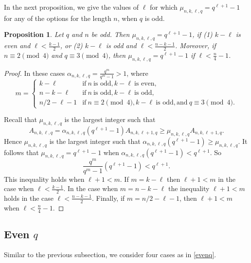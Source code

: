 \documentclass[a4paper,11pt]{article}
\newtheorem{proposition}[theorem]{Proposition}
\begin{document}
In the next proposition, we give the values of $\ell$ for which $\mu_{n,k,\ell,q}=q^{\ell+1}-1$ for any of the options for the length $n$, when $q$ is odd.

\begin{proposition}\label{prop:oddq}
Let $q$ and $n$ be odd. Then $\mu_{n,k,\ell,q}=q^{\ell+1}-1$, if (1) $k-\ell$ is even and $\ell<\frac{k-1}{2}$, or (2) $k-\ell$ is odd and $\ell<\frac{n-k-1}{2}$.
Moreover, if $n\equiv 2\pmod 4$ and $q\equiv 3\pmod 4$, then $\mu_{n,k,\ell,q}=q^{\ell+1}-1$ if $\ell<\frac{n}{4}-1$.
\end{proposition}

\begin{proof} In these cases $\alpha_{n,k,\ell,q}=\frac{q^m}{q^m-1}>1$, where
\[
m=\left\{\begin{array}{ll}
k-\ell&\mbox{if} \ n \ \mbox{is odd}, k-\ell \ \mbox{is even},\\
n-k-\ell&\mbox{if} \ n \ \mbox{is odd}, k-\ell \ \mbox{is odd},\\
n/2-\ell-1&\mbox{if} \ n\equiv 2\pmod 4, k-\ell \ \mbox{is odd}, \mbox{and} \ q\equiv 3\pmod 4.
\end{array}\right.
\]

Recall that $\mu_{n,k,\ell,q}$ is the largest integer such that
$$A_{n,k,\ell,q}=\alpha_{n,k,\ell,q}(q^{\ell+1}-1)A_{n,k,\ell+1,q} \ge \mu_{n,k,\ell,q} A_{n,k,\ell+1,q}.$$
Hence $\mu_{n,k,\ell,q}$ is the largest integer such that
$\alpha_{n,k,\ell,q}(q^{\ell+1}-1) \ge \mu_{n,k,\ell,q} $.
It follows that $\mu_{n,k,\ell,q}=q^{\ell+1}-1$ when $\alpha_{n,k,\ell,q}(q^{\ell+1}-1)<q^{\ell+1}$. So
$$\frac{q^m}{q^m-1}(q^{\ell+1}-1)<q^{\ell+1}.$$
This inequality holds when $\ell+1<m$. If $m=k-\ell$ then $\ell+1<m$ in the case when $\ell<\frac{k-1}{2}$. In the case when $m=n-k-\ell$ the inequality $\ell+1<m$ holds in the case $\ell<\frac{n-k-1}{2}$. Finally, if $m=n/2-\ell-1$, then $\ell+1<m$ when $\ell<\frac{n}{4}-1$.
\end{proof}

\subsection{Even $q$}

Similar to the previous subsection, we consider four cases as  in \eqref{evenq}.
\end{document}
